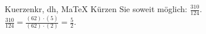 \begin{MAufgabe}{Kuerzen}{kr, dh, MaTeX}
K\"urzen Sie soweit m\"oglich: $\frac{310}{124}$.\\ 
\ifLsg\MLoesung
\quad $\frac{310}{124}=\frac{(62)\cdot(5)}{(62)\cdot(2)}=\frac{5}{2}$.\else\relax\fi
 \end{MAufgabe}